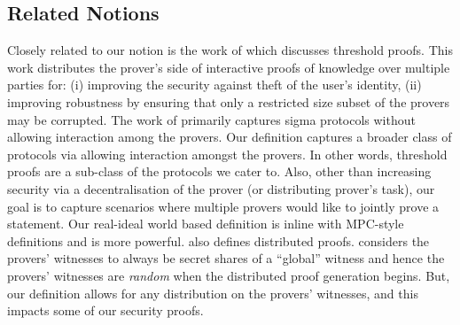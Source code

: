 
\subsection{Related Notions}
Closely related to our notion is the work of \cite{EfficientTZ} which discusses threshold proofs. This work distributes the prover's side of interactive proofs of knowledge over multiple parties for: (i) improving the security against theft of the user's identity, (ii) improving robustness by ensuring that only a restricted size subset of the provers may be corrupted. The work of \cite{EfficientTZ} primarily captures sigma protocols without allowing interaction among the provers. Our definition captures a broader class of protocols via allowing interaction amongst the provers.  In other words, threshold proofs are a sub-class of the protocols we cater to. Also, other than increasing security via a decentralisation of the prover (or distributing prover's task), our goal is to capture scenarios where multiple provers would like to jointly prove a statement.  Our real-ideal world based definition is inline with MPC-style definitions and is more powerful. \cite{Ped92} also defines distributed proofs. %
 \cite{Ped92} considers the provers' witnesses to always be secret shares of a ``global'' witness and hence the provers' witnesses are \textit{random} when the distributed proof generation begins. But, our definition allows for any distribution on the provers' witnesses, and this impacts some of our security proofs.




